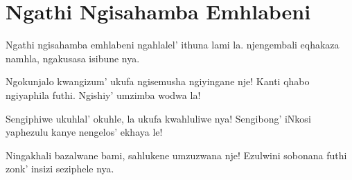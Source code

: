 \starttocol
\chapter{Ngathi Ngisahamba Emhlabeni}
\nexttocol
\hfill{\it }
\stoptocol
\starttocol
\startlines
{\sc Ngathi} ngisahamba emhlabeni
ngahlalel' ithuna lami la.
njengembali eqhakaza namhla,
ngakusasa isibune nya.

Ngokunjalo kwangizum' ukufa
ngisemusha ngiyingane nje!
Kanti qhabo ngiyaphila futhi.
Ngishiy' umzimba wodwa la!

Sengiphiwe ukuhlal' okuhle,
la ukufa kwahluliwe nya!
Sengibong' iNkosi yaphezulu
kanye nengelos' ekhaya le!

Ningakhali bazalwane bami,
sahlukene umzuzwana nje!
Ezulwini sobonana futhi
zonk' insizi seziphele nya.
\stoplines
\nexttocol

\stoptocol
